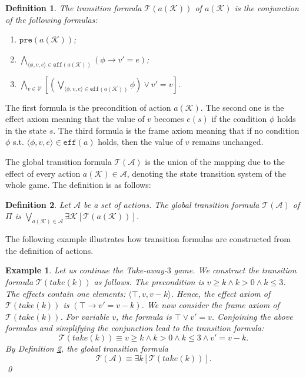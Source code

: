 \documentclass[review]{elsarticle}
\newcommand{\tuple}[1]{\langle {#1} \rangle}
\newcommand{\true}{\top}
\newcommand{\actparm}{\mathcal{K}}
\newcommand{\act}{\mathcal{A}}
\newcommand{\trans}{\mathcal{T}}
\newcommand{\pre}{\mathtt{pre}}
\newcommand{\eff}{\mathtt{eff}}
\newcommand{\con}{\phi}
\newcommand{\var}{\mathcal{V}}
\newtheorem{definition}{Definition}
\newtheorem{example}{Example}
\begin{document}
    \begin{definition}\label{def:transForm} \rm	
    	The transition formula $\trans(a(\actparm))$ of $a(\actparm)$ is the conjunction of the following formulas: 
    	\begin{enumerate}
    		\item $\pre(a(\actparm))$;
    		\item $\bigwedge_{\tuple{\con, v, e} \in \eff(a(\actparm))} (\con \rightarrow v' = e)$;
    		\item $\bigwedge_{v \in \var} [(\bigvee_{\tuple{\con, v, e} \in \eff(a(\actparm))} \con) \lor v' = v]$.
    	\end{enumerate}
    \end{definition}
    
    The first formula is the precondition of action $a(\actparm)$.
    The second one is the effect axiom meaning that the value of $v$ becomes $e(s)$ if the condition $\con$ holds in the state $s$.
    The third formula is the frame axiom meaning that if no condition $\con$ s.t. $\tuple{\con, v, e} \in \eff(a)$ holds, then the value of $v$ remains unchanged. 
    
    The global transition formula $\trans(\act)$ is the union of the mapping due to the effect of every action $a(\actparm) \in \act$, denoting the state transition system of the whole game.
    The definition is as follows:
    
    \begin{definition}\label{def:globalTransForm} \rm
    	Let $\act$ be a set of actions.
    	The global transition formula $\trans(\act)$ of $\Pi$ is $\bigvee_{a(\actparm) \in \act} \exists \actparm [\trans(a(\actparm))]$.
    \end{definition}
    
    The following example illustrates how transition formulas are constructed from the definition of actions.
    \begin{example}\label{exm:transForm} \rm
    	Let us continue the Take-away-$3$ game.
    	We construct the transition formula $\trans(take(k))$ as follows.
    	The precondition is $v \geq k \land k > 0 \land k \leq 3$.
    	The effects contain one elements: $\tuple{\true, v, v - k}$.
    	Hence, the effect axiom of $\trans(take(k))$ is $(\true \rightarrow v' = v - k)$.
    	We now consider the frame axiom of $\trans(take(k))$.
    	For variable $v$, the formula is $\true \lor v' = v $.
    	Conjoining the above formulas and simplifying the conjunction lead to the transition formula: 
    	\[\trans(take(k)) \equiv v \geq k \land k > 0 \land k \leq 3 \land v' = v - k.\]
    	By Definition \ref{def:globalTransForm}, the global transition formula
    	\[\trans(\act) \equiv \exists k [\trans(take(k))].\]  	\qed
    \end{example}
    
\end{document}
